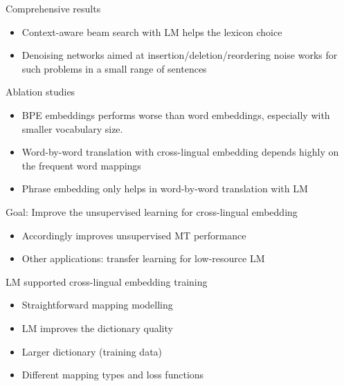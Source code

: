 \documentclass[11pt, a4paper, landscape]{article}
\begin{document}
	\NewPage
	\vfill
	Comprehensive results
	\begin{itemize}
		\item Context-aware beam search with LM helps the lexicon choice
		\item Denoising networks aimed at insertion/deletion/reordering noise works for such problems in a small range of sentences\\
	\end{itemize}
	Ablation studies
	\begin{itemize}
		\item BPE embeddings performs worse than word embeddings, especially with smaller
		vocabulary size.
		\item Word-by-word translation with cross-lingual
embedding depends highly on the frequent word mappings
		\item Phrase embedding only helps in word-by-word translation with LM
	\end{itemize}
	\vfill
	\NewPage
	\vfill
	Goal: Improve the unsupervised learning for cross-lingual embedding

	\begin{itemize}
		\item Accordingly improves unsupervised MT performance
		\item Other applications: transfer learning for low-resource LM \cite{adams2017cross}\\
	\end{itemize}
   
	LM supported cross-lingual embedding training
	\begin{itemize}
		\item Straightforward mapping modelling		
		\item LM improves the dictionary quality
		\item Larger dictionary (training data)
		\item Different mapping types and loss functions
	\end{itemize}
	\vfill
\end{document}
